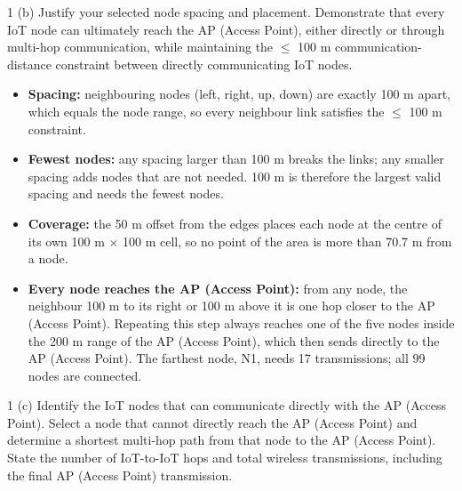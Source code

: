 
\begin{question}{1 (b)}
Justify your selected node spacing and placement. Demonstrate that every IoT node can ultimately
reach the AP (Access Point), either directly or through multi-hop communication, while maintaining the $\leq$ 100 m
communication-distance constraint between directly communicating IoT nodes.
\end{question}

\begin{itemize}
\item \textbf{Spacing:} neighbouring nodes (left, right, up, down) are exactly 100 m apart, which equals the node
range, so every neighbour link satisfies the $\leq$ 100 m constraint.
\item \textbf{Fewest nodes:} any spacing larger than 100 m breaks the links; any smaller spacing adds nodes that are
not needed. 100 m is therefore the largest valid spacing and needs the fewest nodes.
\item \textbf{Coverage:} the 50 m offset from the edges places each node at the centre of its own 100 m $\times$ 100
m cell, so no point of the area is more than 70.7 m from a node.
\item \textbf{Every node reaches the AP (Access Point):} from any node, the neighbour 100 m to its right or 100 m
above it is one hop closer to the AP (Access Point). Repeating this step always reaches one of the five nodes inside
the 200 m range of the AP (Access Point), which then sends directly to the AP (Access Point). The farthest node, N1,
needs 17 transmissions; all 99 nodes are connected.
\end{itemize}

\begin{question}{1 (c)}
Identify the IoT nodes that can communicate directly with the AP (Access Point). Select a node
that cannot directly reach the AP (Access Point) and determine a shortest multi-hop path from that node to the AP
(Access Point). State the number of IoT-to-IoT hops and total wireless
transmissions, including the final AP (Access Point) transmission.
\end{question}

